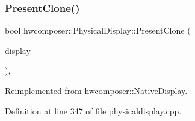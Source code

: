 \mbox{\label{classhwcomposer_1_1PhysicalDisplay_a3432baaabedbb27e45ea64fcc894a344}} 
\subsubsection{\texorpdfstring{Present\+Clone()}{PresentClone()}}
{\footnotesize\ttfamily bool hwcomposer\+::\+Physical\+Display\+::\+Present\+Clone (\begin{DoxyParamCaption}\item[{\mbox{\hyperlink{classhwcomposer_1_1NativeDisplay}{Native\+Display}} $\ast$}]{display }\end{DoxyParamCaption})\hspace{0.3cm}{\ttfamily [override]}, {\ttfamily [virtual]}}



Reimplemented from \mbox{\hyperlink{classhwcomposer_1_1NativeDisplay_ae031f7f90f8a4ab3fba24a31c4cc6b74}{hwcomposer\+::\+Native\+Display}}.



Definition at line 347 of file physicaldisplay.\+cpp.


